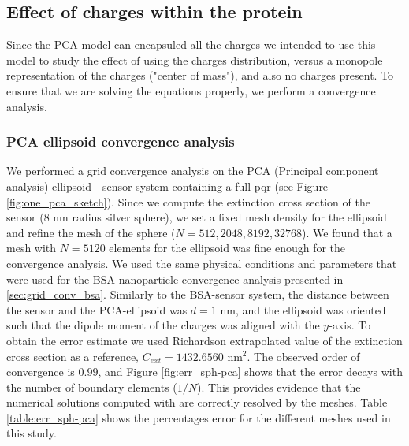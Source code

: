 \subsection{Effect of charges within the protein}

Since the PCA model can encapsuled all the charges we intended to use this model to study the effect of using the charges distribution, versus
a monopole representation of the charges ("center of mass"), and also no charges present. To ensure that we are solving the equations properly, 
we perform a convergence analysis.


\subsubsection{PCA ellipsoid convergence analysis}

We performed a grid convergence analysis on the PCA (Principal component analysis) ellipsoid - sensor system containing a full pqr (see Figure \ref{fig:one_pca_sketch}). 
Since we compute the extinction cross section of the sensor (8 nm radius silver sphere), we set a fixed mesh density for the ellipsoid and refine 
the mesh of the sphere ($N=512, 2048, 8192, 32768$). We found that a mesh with $N=5120$ elements for the ellipsoid was fine enough for the convergence analysis.
We used the same physical conditions and parameters that were used for the BSA-nanoparticle convergence analysis presented in
\ref{sec:grid_conv_bsa}. Similarly to the BSA-sensor system, the distance between the sensor and the PCA-ellipsoid 
was $d=1$ nm, and the ellipsoid was oriented such that the dipole moment of the charges was aligned with the $y$-axis. To obtain the error 
estimate we used Richardson extrapolated value of the extinction cross section as a reference, $C_{ext} = 1432.6560$ nm$^2$.
The observed order of convergence is $0.99$, and Figure \ref{fig:err_sph-pca} shows that the error decays with the number of boundary elements ($1/N$). This provides
evidence that the numerical solutions computed with \pygbe are correctly resolved by the meshes.  Table \ref{table:err_sph-pca} shows the percentages error for the different 
meshes used in this study.

